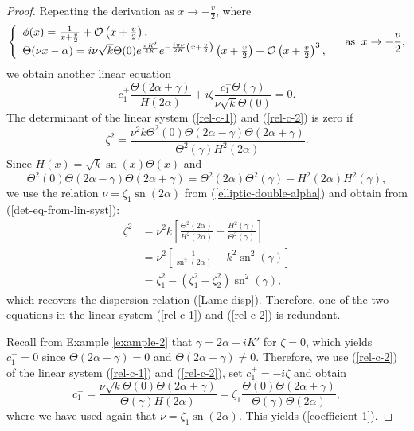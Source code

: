 \documentclass[12pt,reqno]{amsart}
\numberwithin{equation}{section}
\DeclareMathOperator{\sn}{sn}
\begin{document}
\begin{proof}
Repeating the derivation as $x \to -\frac{v}{2}$, where 
$$
\left\{ \begin{array}{l} 
\phi(x) = \frac{1}{x + \frac{v}{2}} + \mathcal{O}\left(x + \frac{v}{2}\right), \\
\Theta(\nu x - \alpha) = i \nu \sqrt{k}\Theta(0)  e^{\frac{\pi K'}{4K}} e^{-\frac{i \pi \nu}{2K} \left(x + \frac{v}{2} \right)} \left( x + \frac{v}{2} \right) + \mathcal{O}\left(x + \frac{v}{2} \right)^3, \end{array} \right. \quad \mbox{\rm as} \;\; x \to -\frac{v}{2}, 
$$
we obtain another linear equation 
\begin{equation}
\label{rel-c-2}
c_1^+ \frac{\Theta(2 \alpha + \gamma)}{H(2\alpha)} + i \zeta \frac{c_1^-  \Theta(\gamma)}{\nu \sqrt{k} \Theta(0)} = 0.
\end{equation}
The determinant of the linear system (\ref{rel-c-1}) and (\ref{rel-c-2}) is zero if 
\begin{equation}
\label{det-eq-from-lin-syst}
\zeta^2 = \frac{\nu^2 k \Theta^2(0) \Theta(2\alpha-\gamma) \Theta(2\alpha + \gamma)}{\Theta^2(\gamma) H^2(2\alpha)}.
\end{equation}
Since $H(x) = \sqrt{k} \sn(x) \Theta(x)$ and 
$$
\Theta^2(0) \Theta(2\alpha-\gamma) \Theta(2\alpha+\gamma) = \Theta^2(2\alpha) \Theta^2(\gamma) - H^2(2\alpha) H^2(\gamma), 
$$
we use the relation $\nu = \zeta_1 \sn(2\alpha)$ from (\ref{elliptic-double-alpha}) and obtain from (\ref{det-eq-from-lin-syst}):
\begin{align*}
\zeta^2 &= \nu^2 k \left[ \frac{\Theta^2(2 \alpha)}{H^2(2 \alpha)} - \frac{H^2(\gamma)}{\Theta^2(\gamma)} \right] \\
&= \nu^2 \left[ \frac{1}{\sn^2(2\alpha)} - k^2 \sn^2(\gamma) \right] \\
&= \zeta_1^2 -  (\zeta_1^2 - \zeta_2^2) \sn^2(\gamma),
\end{align*}
which recovers the dispersion relation (\ref{Lame-disp}). Therefore, one 
of the two equations in the linear system (\ref{rel-c-1}) and (\ref{rel-c-2}) is redundant.

Recall from Example \ref{example-2} that $\gamma = 2 \alpha + i K'$ for $\zeta = 0$, which yields $c_1^+ = 0$ since $\Theta(2\alpha - \gamma) = 0$ and $\Theta(2\alpha + \gamma) \neq 0$. Therefore, we use (\ref{rel-c-2}) of the linear system (\ref{rel-c-1}) and (\ref{rel-c-2}), set $c_1^+ = -i\zeta$ and obtain 
$$
c_1^- = \frac{\nu \sqrt{k} \Theta(0) \Theta(2\alpha + \gamma)}{\Theta(\gamma) H(2\alpha)} = \zeta_1 \frac{\Theta(0) \Theta(2\alpha + \gamma)}{\Theta(\gamma) \Theta(2\alpha)},
$$
where we have used again that $\nu = \zeta_1 \sn(2\alpha)$. This yields (\ref{coefficient-1}).


\end{proof}
\end{document}
